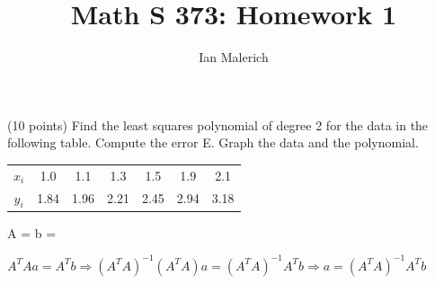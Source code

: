 \documentclass[10pt]{jhwhw}
\author{Ian Malerich}
\title{Math S 373: Homework 1}
\begin{document}
\raggedright

\problem{} (10 points)
	Find the least squares polynomial of degree 2 for the data in the following
	table. Compute the error E. Graph the data and the polynomial.
	\bigbreak
	\begin{tabular}{ccccccc}
		\hline
		$x_i$ & 1.0 & 1.1 & 1.3 & 1.5 & 1.9 & 2.1 \\
		$y_i$ & 1.84 & 1.96 & 2.21 & 2.45 & 2.94 & 3.18 \\
		\hline
	\end{tabular}

\solution

	A = 
	b = 
	\left[\begin{array}{c}
		1.84 \\ 1.96 \\ 2.21 \\ 2.45 \\ 2.94 \\ 3.18 \\
	\end{array} \right]

	\bigbreak
	$A^TAa = A^Tb \Rightarrow (A^TA)^{-1}(A^TA)a = (A^TA)^{-1}A^Tb \Rightarrow
	a = (A^TA)^{-1}A^Tb$
\end{document}
